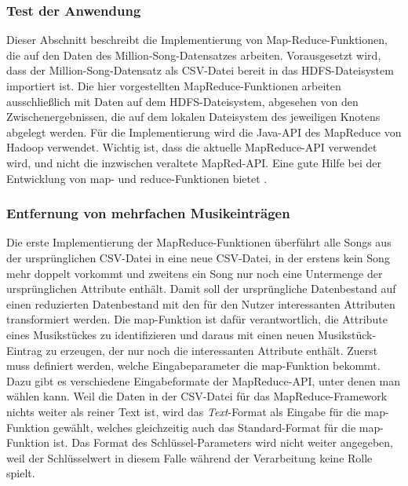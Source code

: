 \subsubsection{Test der Anwendung}

Dieser Abschnitt beschreibt die Implementierung von Map-Reduce-Funktionen, die auf den Daten
des Million-Song-Datensatzes arbeiten. Vorausgesetzt wird, dass der Million-Song-Datensatz als
CSV-Datei bereit in das HDFS-Dateisystem importiert ist. Die hier vorgestellten MapReduce-Funktionen
arbeiten ausschließlich mit Daten auf dem HDFS-Dateisystem, abgesehen von den Zwischenergebnissen,
die auf dem lokalen Dateisystem des jeweiligen Knotens abgelegt werden.
Für die Implementierung wird die Java-API des MapReduce von Hadoop verwendet. Wichtig ist,
dass die aktuelle MapReduce-API verwendet wird, und nicht die inzwischen veraltete MapRed-API.
Eine gute Hilfe bei der Entwicklung von map- und reduce-Funktionen bietet \cite{miner2012mapreduce}.

\subsubsection{Entfernung von mehrfachen Musikeinträgen}
\label{section:mehrfacheSongs}
Die erste Implementierung der MapReduce-Funktionen überführt alle Songs aus der ursprünglichen
CSV-Datei in eine neue CSV-Datei, in der erstens kein Song mehr doppelt vorkommt und zweitens
ein Song nur noch eine Untermenge der ursprünglichen Attribute enthält. Damit soll der ursprüngliche
Datenbestand auf einen reduzierten Datenbestand mit den für den Nutzer interessanten Attributen 
transformiert werden. Die map-Funktion ist dafür verantwortlich, die Attribute eines Musikstückes
zu identifizieren und daraus mit einen neuen Musikstück-Eintrag zu erzeugen, der nur noch die interessanten
Attribute enthält.
Zuerst muss definiert werden, welche Eingabeparameter die map-Funktion bekommt. Dazu gibt es verschiedene
Eingabeformate der MapReduce-API, unter denen man wählen kann. Weil die Daten in der CSV-Datei für das
MapReduce-Framework nichts weiter als reiner Text ist, wird das \textit{Text}-Format als Eingabe für
die map-Funktion gewählt, welches gleichzeitig auch das Standard-Format für die map-Funktion ist.
Das Format des Schlüssel-Parameters wird nicht weiter angegeben, weil der Schlüsselwert in diesem Falle 
während der Verarbeitung keine Rolle spielt.

